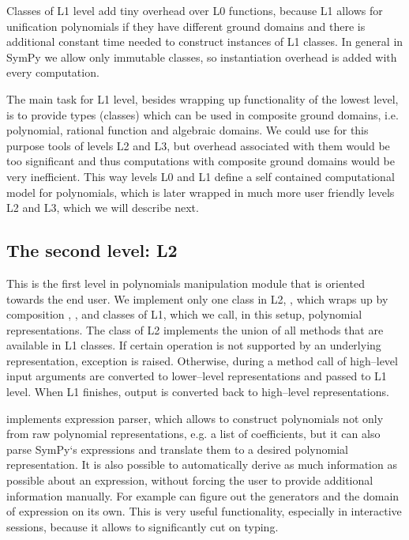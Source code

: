 Classes of L1 level add tiny overhead over L0 functions, because L1 allows for unification
polynomials if they have different ground domains and there is additional constant time
needed to construct instances of L1 classes. In general in SymPy we allow only immutable
classes, so instantiation overhead is added with every computation.

The main task for L1 level, besides wrapping up functionality of the lowest level, is to
provide types (classes) which can be used in composite ground domains, i.e. polynomial,
rational function and algebraic domains. We could use for this purpose tools of levels L2
and L3, but overhead associated with them would be too significant and thus computations
with composite ground domains would be very inefficient. This way levels L0 and L1 define
a self contained computational model for polynomials, which is later wrapped in much more
user friendly levels L2 and L3, which we will describe next.


\subsection{The second level: L2}

This is the first level in polynomials manipulation module that is oriented towards the end user.
We implement only one class in L2, , which wraps up by composition , ,
 and  classes of L1, which we call, in this setup, polynomial representations. The
class of L2 implements the union of all methods that are available in L1 classes. If certain
operation is not supported by an underlying representation,  exception
is raised. Otherwise, during a method call of  high--level input arguments are converted
to lower--level representations and passed to L1 level. When L1 finishes, output is converted back
to high--level representations.

 implements expression parser, which allows to construct polynomials not only from
raw polynomial representations, e.g. a list of coefficients, but it can also parse SymPy`s
expressions and translate them to a desired polynomial representation. It is also possible to
automatically derive as much information as possible about an expression, without forcing the
user to provide additional information manually. For example  can figure out the
generators and the domain of expression on its own. This is very useful functionality, especially
in interactive sessions, because it allows to significantly cut on typing.


